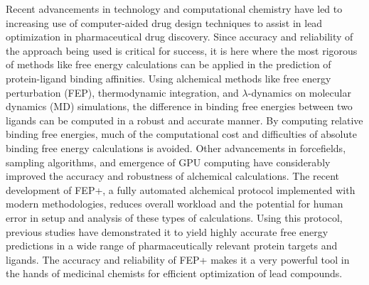 \documentclass[journal=jctcce,manuscript=article]{achemso}
\begin{document}
Recent advancements in technology and computational chemistry have led to increasing use of computer-aided drug design techniques to assist in lead optimization in pharmaceutical drug discovery.
Since accuracy and reliability of the approach being used is critical for success, it is here where the most rigorous of methods like free energy calculations can be applied in the prediction of protein-ligand binding affinities. 
Using alchemical methods like free energy perturbation (FEP), thermodynamic integration, and $\lambda$-dynamics on molecular dynamics (MD) simulations, the difference in binding free energies between two ligands can be computed in a robust and accurate manner.
By computing relative binding free energies, much of the computational cost and difficulties of absolute binding free energy calculations is avoided\cite{doi:10.1021/ct5000296,chipot2007free,chodera2011alchemical,knight2009lambda,zheng2008random,gallicchio2011advances,doi:10.1021/ct500161f}.
Other advancements in forcefields, sampling algorithms, and emergence of GPU computing have considerably improved the accuracy and robustness of alchemical calculations. 
The recent development of FEP+, a fully automated alchemical protocol implemented with modern methodologies, reduces overall workload and the potential for human error in setup and analysis of these types of calculations.
Using this protocol, previous studies\cite{FEPplus} have demonstrated it to yield highly accurate free energy predictions in a wide range of pharmaceutically relevant protein targets and ligands.
The accuracy and reliability of FEP+ makes it a very powerful tool in the hands of medicinal chemists for efficient optimization of lead compounds.
\end{document}
